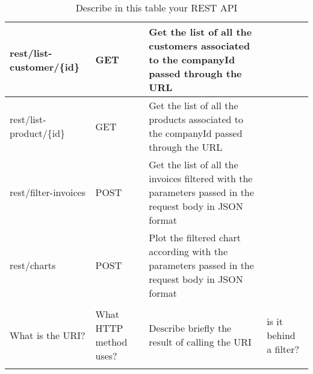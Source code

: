\begin{longtable}{|p{}|p{} |p{}|p{}|}
rest/list-customer/\{id\} & GET & Get the list of all the customers associated to the companyId passed through the URL \\\hline
rest/list-product/\{id\} & GET & Get the list of all the products associated to the companyId passed through the URL \\\hline
rest/filter-invoices & POST & Get the list of all the invoices filtered with the parameters passed in the request body in JSON format \\\hline
rest/charts & POST & Plot the filtered chart according with the parameters passed in the request body in JSON format \\\hline
\\\hline

What is the URI? & What HTTP method uses? &  Describe briefly the result of calling the URI & is it behind a filter?\\\hline
\caption{Describe in this table your REST API}
\label{tab:termGlossary}
\end{longtable}